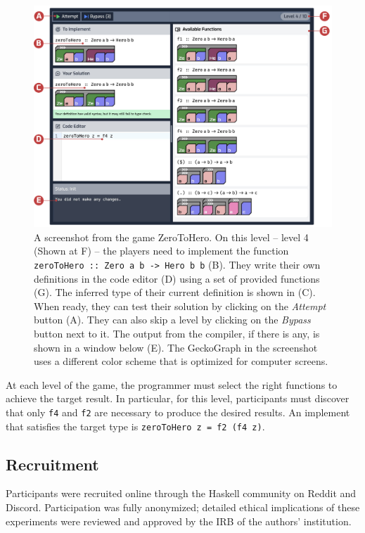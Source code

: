 \begin{figure}[hbt]
  \includegraphics[width=\linewidth]{figures/GamePlay2}
  \caption[A screenshot from  the game ZeroToHero]{\label{fig:level-example} A screenshot from  the game ZeroToHero. On this level -- level 4 (Shown at F) -- the players need to implement the function \texttt{ zeroToHero :: Zero a b -> Hero b b} (B). They write their own definitions in the code editor (D) using a set of provided functions (G). The inferred type of their current definition is shown in (C). When ready, they can test their solution by clicking on the \textit{Attempt} button (A). They can also skip a level by clicking on the \textit{Bypass} button next to it. The output from the compiler, if there is any, is shown in a window below (E). The GeckoGraph in the screenshot uses a different color scheme that is optimized for computer screens.}
\end{figure}

At each level of the game, the programmer must select the right functions to achieve the target result. In particular, for this level, participants must discover that only \texttt{f4} and \texttt{f2} are necessary to produce the desired results. An implement that satisfies the target type is \texttt{zeroToHero z = f2  (f4  z)}. 


\subsection{Recruitment}
Participants were recruited online through the Haskell community on Reddit and Discord. Participation was fully anonymized; detailed ethical implications of these experiments were reviewed and approved by the IRB of the authors' institution.

